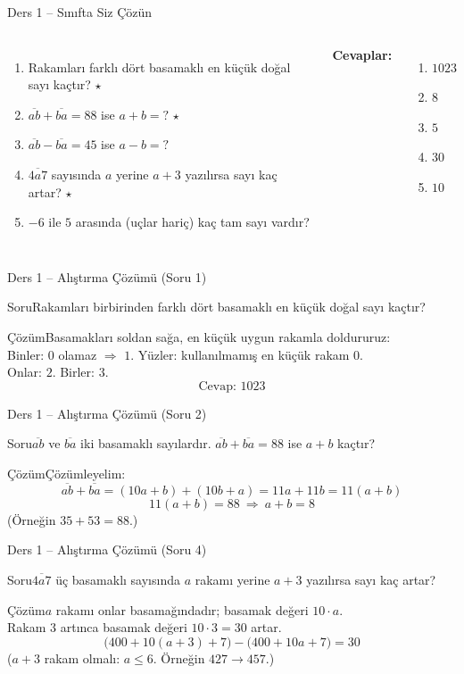 \documentclass[aspectratio=169,11pt]{beamer}
\newcommand{\soru}[3]{%
\begin{frame}{#1}
  \begin{block}{Soru}\large #2\end{block}
  \pause
  \begin{exampleblock}{Çözüm}\large #3\end{exampleblock}
\end{frame}}
\newcommand{\ab}[1]{\overline{#1}}
\begin{document}
\begin{frame}{Ders 1 -- Sınıfta Siz Çözün}
\begin{columns}[t]
\begin{enumerate}
\item Rakamları farklı dört basamaklı en küçük doğal sayı kaçtır? \(\star\)
\item \(\ab{ab}+\ab{ba}=88\) ise \(a+b=?\) \(\star\)
\item \(\ab{ab}-\ab{ba}=45\) ise \(a-b=?\)
\item \(\ab{4a7}\) sayısında \(a\) yerine \(a+3\) yazılırsa sayı kaç artar? \(\star\)
\item \(-6\) ile \(5\) arasında (uçlar hariç) kaç tam sayı vardır?
\end{enumerate}
\pause
\textbf{Cevaplar:}
\begin{enumerate}
\item \(1023\)
\item \(8\)
\item \(5\)
\item \(30\)
\item \(10\)
\end{enumerate}
\end{columns}
\vspace{4pt}{\footnotesize \(\star\) işaretli soruların adım adım çözümü sonraki slaytlardadır.}
\end{frame}

\soru{Ders 1 -- Alıştırma Çözümü (Soru 1)}
{Rakamları birbirinden farklı dört basamaklı en küçük doğal sayı kaçtır?}
{Basamakları soldan sağa, en küçük uygun rakamla doldururuz:\\[3pt]
Binler: \(0\) olamaz \(\Rightarrow\) \(1\). \quad Yüzler: kullanılmamış en küçük rakam \(0\).\\[3pt]
Onlar: \(2\). \quad Birler: \(3\).
\[\text{Cevap: } 1023\]}

\soru{Ders 1 -- Alıştırma Çözümü (Soru 2)}
{\(\ab{ab}\) ve \(\ab{ba}\) iki basamaklı sayılardır. \(\ab{ab}+\ab{ba}=88\) ise \(a+b\) kaçtır?}
{Çözümleyelim:
\[\ab{ab}+\ab{ba}=(10a+b)+(10b+a)=11a+11b=11(a+b)\]
\[11(a+b)=88\ \Rightarrow\ a+b=8\]
(Örneğin \(35+53=88\).)}

\soru{Ders 1 -- Alıştırma Çözümü (Soru 4)}
{\(\ab{4a7}\) üç basamaklı sayısında \(a\) rakamı yerine \(a+3\) yazılırsa sayı kaç artar?}
{\(a\) rakamı onlar basamağındadır; basamak değeri \(10\cdot a\).\\[3pt]
Rakam \(3\) artınca basamak değeri \(10\cdot 3=30\) artar.
\[\big(400+10(a+3)+7\big)-\big(400+10a+7\big)=30\]
(\(a+3\) rakam olmalı: \(a\le 6\). Örneğin \(427\to 457\).)}
\end{document}
